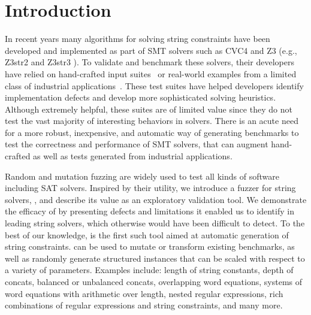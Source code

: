 \section{Introduction}

In recent years many algorithms for solving string constraints have
been developed and implemented as part of SMT solvers such as CVC4
\cite{cvc4} and Z3 (e.g., Z3str2 \cite{z3str2} and Z3str3
\cite{z3str3}). To validate and benchmark these solvers, their
developers have relied on hand-crafted input
suites~\cite{cvc4-tests,z3str3-tests,z3str2-tests} or real-world
examples from a limited class of industrial
applications~\cite{kaluza,kausler}. These test suites have helped
developers identify implementation defects and develop more
sophisticated solving heuristics. Although extremely helpful, these
suites are of limited value since they do not test the vast majority
of interesting behaviors in solvers. There is an acute need for a more
robust, inexpensive, and automatic way of generating benchmarks to test
the correctness and performance of SMT solvers, that can augment
hand-crafted as well as tests generated from industrial applications.

Random and mutation fuzzing are widely used to test all kinds of software
including SAT solvers. Inspired by their utility, we introduce a
fuzzer for string solvers, \fuzzer{}, and describe its value as an
exploratory validation tool. We demonstrate the efficacy of \fuzzer{}
by presenting defects and limitations it enabled us to identify in
leading string solvers, which otherwise would have been difficult to
detect. To the best of our knowledge, \fuzzer{} is the first such tool
aimed at automatic generation of string constraints. \fuzzer{} can be
used to mutate or transform existing benchmarks, as well as
randomly generate structured instances that can be scaled with respect
to a variety of parameters. Examples include: length of string constants,
depth of concats, balanced or unbalanced concats, overlapping word equations,
systems of word equations with arithmetic over length, nested regular
expressions, rich combinations of regular expressions and string
constraints, and many more.


